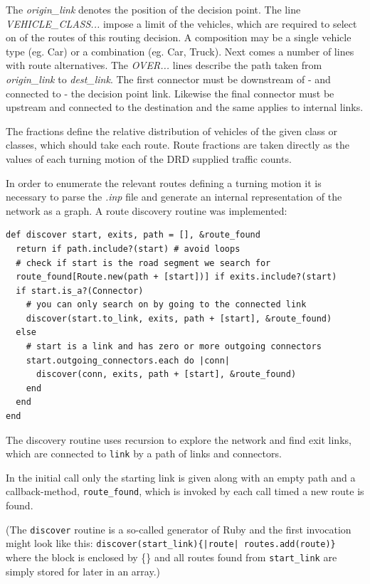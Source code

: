 The \textit{origin\_link} denotes the position of the decision point. The line \textit{VEHICLE\_CLASS...} impose a limit of the vehicles, which are required to select on of the routes of this routing decision. A composition may be a single vehicle type (eg. Car) or a combination (eg. Car, Truck). Next comes a number of lines with route alternatives. The \textit{OVER...} lines describe the path taken from \textit{origin\_link} to \textit{dest\_link}. The first connector must be downstream of - and connected to - the decision point link. Likewise the final connector must be upstream and connected to the destination and the same applies to internal links.

The fractions define the relative distribution of vehicles of the given class or classes, which should take each route. Route fractions are taken directly as the values of each turning motion of the DRD supplied traffic counts.

In order to enumerate the relevant routes defining a turning motion it is necessary to parse the \textit{.inp} file and generate an internal representation of the network as a graph. A route discovery routine was implemented:

\begin{verbatim}
def discover start, exits, path = [], &route_found
  return if path.include?(start) # avoid loops
  # check if start is the road segment we search for
  route_found[Route.new(path + [start])] if exits.include?(start)
  if start.is_a?(Connector)
    # you can only search on by going to the connected link
    discover(start.to_link, exits, path + [start], &route_found)
  else
    # start is a link and has zero or more outgoing connectors 
    start.outgoing_connectors.each do |conn|
      discover(conn, exits, path + [start], &route_found)
    end
  end
end
\end{verbatim}

The discovery routine uses recursion to explore the network and find exit links, which are connected to \verb|link| by a path of links and connectors.

In the initial call only the starting link is given along with an empty path and a callback-method, \verb|route_found|, which is invoked by each call timed a new route is found. 

(The \verb|discover| routine is a so-called generator of Ruby and the first invocation might look like this: \verb+discover(start_link){|route| routes.add(route)}+ where the block is enclosed by \{\} and all routes found from \verb|start_link| are simply stored for later in an array.)


